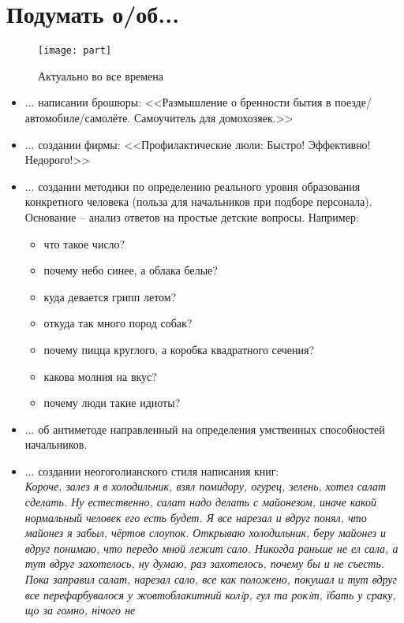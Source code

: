 \section{Подумать о/об...}
\begin{figure}[ht!]
    \centering
    \texttt{[image: part]}
    \caption{Актуально во все времена}
\end{figure}
\begin{itemize}
    \item ... написании брошюры: <<Размышление о бренности бытия в поезде/автомобиле/самолёте. Самоучитель для домохозяек.>>
    \item ... создании фирмы: <<Профилактические люли: Быстро! Эффективно! Недорого!>>
    \item ...  создании методики по определению реального уровня образования конкретного человека (польза для начальников при подборе персонала). Основание -- анализ ответов на простые детские вопросы.
    Например:
        \begin{itemize}
            \item что такое число?
            \item почему небо синее, а облака белые?
            \item куда девается грипп летом?
            \item откуда так много пород собак?
            \item почему пицца круглого, а коробка квадратного сечения?
            \item какова молния на вкус?
            \item почему люди такие идиоты?
        \end{itemize}
    \item ... об антиметоде направленный на определения умственных способностей начальников.    
    \item ... создании неогоголианского стиля написания книг:\\
        \emph{Короче, залез я в холодильник, взял помидору, огурец, зелень, хотел салат сделать. Ну естественно, 
            салат надо делать с майонезом, иначе какой нормальный человек его есть будет. Я все нарезал и вдруг 
            понял, что майонез я забыл, чёртов слоупок. Открываю холодильник, беру майонез и вдруг понимаю, что 
            передо мной лежит сало. Никогда раньше не ел сала, а тут вдруг захотелось, ну думаю, раз захотелось, 
            почему бы и не съесть. Пока заправил салат, нарезал сало, все как положено, покушал и тут вдруг все 
            перефарбувалося у жовтоблакитний колiр, гул та рокiт, їбать у сраку, що за гомно, нічого не 
}
\end{itemize}
